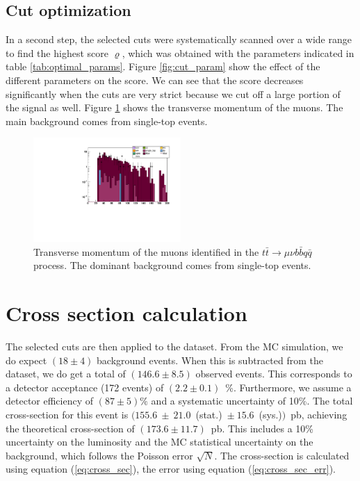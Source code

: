 \documentclass[%
 reprint,
 amsmath,amssymb,
 aps,
]{revtex4-2}
\begin{document}
\subsection{Cut optimization}
In a second step, the selected cuts were systematically scanned over a wide range to find the highest score $\varrho$, which was obtained with the parameters indicated in table \ref{tab:optimal_params}. 
Figure \ref{fig:cut_param} show the effect of the different parameters on the score. We can see that the score decreases significantly when the cuts are very strict because we cut off a large portion of the signal as well. 
Figure \ref{fig:muon_pt} shows the transverse momentum of the muons. The main background comes from single-top events. 

\begin{figure}
    \centering
    \includegraphics[width=0.5\textwidth]{Plots/part1/Muon_Pt.pdf}
    \caption{Transverse momentum of the muons identified in the $t \bar t \rightarrow \mu \nu b \bar b q \bar q$ process. The dominant background comes from single-top events.}
    \label{fig:muon_pt}
\end{figure}

\section{Cross section calculation}
The selected cuts are then applied to the dataset. From the MC simulation, we do expect $(18 \pm 4)$ background events. When this is subtracted from the dataset, we do get a total of $(146.6 \pm 8.5)$ observed events. This corresponds to a detector acceptance (172 events) of $(2.2 \pm 0.1)$~\%. Furthermore, we assume a detector efficiency of $(87 \pm 5)\%$ and a systematic uncertainty of 10\%. 
The total cross-section for this event is $(155.6~\pm~21.0$~(stat.)~$\pm~15.6$~(sys.)$)$~pb, achieving the theoretical cross-section of $(173.6 \pm 11.7)$~pb. This includes a 10\% uncertainty on the luminosity and the MC statistical uncertainty on the background, which follows the Poisson error $\sqrt{N}$. The cross-section is calculated using equation (\ref{eq:cross_sec}), the error using equation (\ref{eq:cross_sec_err}).
\end{document}
